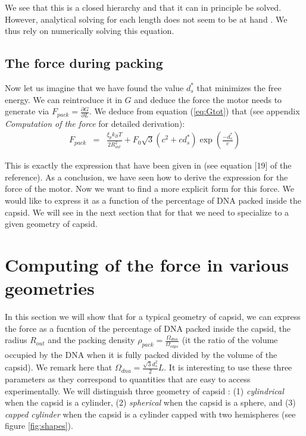 \documentclass{article}
\begin{document}
We see that this is a closed hierarchy and that it can in principle be solved. However, analytical solving for each length does not seem to be at hand \cite{purohit2003}. We thus rely on numerically solving this equation.

\subsection{The force during packing}
Now let us imagine that we have found the value $d^*_s$ that minimizes the free energy. We can reintroduce it in $G$ and deduce the force the motor needs to generate via $F_{pack} = \frac{\partial G}{\partial L}$. We deduce from equation (\ref{eq:Gtot}) that (see appendix \emph{Computation of the force} for detailed derivation):
\begin{eqnarray}
    F_{pack} &=& \frac{\xi_p k_B T}{2 R_{int}^2} + F_0 \sqrt{3} \left( c^2 + c d_s^* \right) \exp{ \left( \frac{-d^*_s}{c} \right) }
    \label{eq:F}
\end{eqnarray}

This is exactly the expression that have been given in \cite{purohit2003} (see equation [19] of the reference).
As a conclusion, we have seen how to derive the expression for the force of the motor. Now we want to find a more explicit form for this force. We would like to express it as a function of the percentage of DNA packed inside the capsid. We will see in the next section that for that we need to specialize to a given geometry of capsid.

\section{Computing of the force in various geometries}

In this section we will show that for a typical geometry of capsid, we can express the force as a fucntion of the percentage of DNA packed inside the capsid, the radius $R_{out}$ and the packing density $\rho_{pack} = \frac{\Omega_{dna}}{\Omega_{caps}}$ (it the ratio of the volume occupied by the DNA when it is fully packed divided by the volume of the capsid). We remark here that $ \Omega_{dna} = \frac{\sqrt{3}d_s^2}{2} L$. It is interesting to use these three parameters as they correspond to quantities that are easy to access experimentally. \cite{phillips2005, purohit2003} We will distinguish three geometry of capsid : (1) \emph{cylindrical} when the capsid is a cylinder, (2) \emph{spherical} when the capsid is a sphere, and (3) \emph{capped cylinder} when the capsid is a cylinder capped with two hemispheres (see figure \ref{fig:shapes}).
\end{document}
